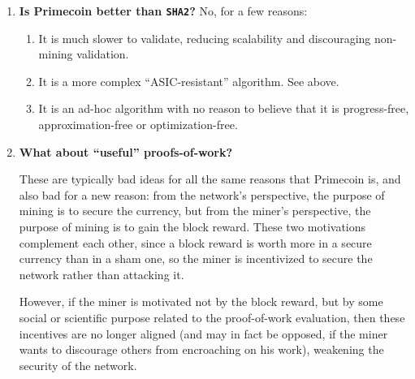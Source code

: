 \documentclass[letterpaper]{article}
\theoremstyle{xxx}
\theoremstyle{evil}
\theoremstyle{yyy}
\theoremstyle{plain}
\theoremstyle{zzz}
\begin{document}
\begin{enumerate}
\item \textbf{Is Primecoin better than \texttt{SHA2}?}
No, for a few reasons:
\begin{enumerate}
\item It is much slower to validate, reducing scalability and discouraging
non-mining validation.
\item It is a more complex ``ASIC-resistant'' algorithm. See above.
\item It is an ad-hoc algorithm with no reason to believe that it is progress-free,
approximation-free or optimization-free.
\end{enumerate}

\item \textbf{What about ``useful'' proofs-of-work?}

These are typically bad ideas for all the same reasons that Primecoin is,
and also bad for a new reason: from the network's perspective, the purpose
of mining is to secure the currency, but from the miner's perspective, the
purpose of mining is to gain the block reward. These two motivations
complement each other, since a block reward is worth more in a secure
currency than in a sham one, so the miner is incentivized to secure the
network rather than attacking it.

However, if the miner is motivated not by the block reward, but by some
social or scientific purpose related to the proof-of-work evaluation,
then these incentives are no longer aligned (and may in fact be opposed,
if the miner wants to discourage others from encroaching on his work),
weakening the security of the network.

\end{enumerate}
\end{document}
